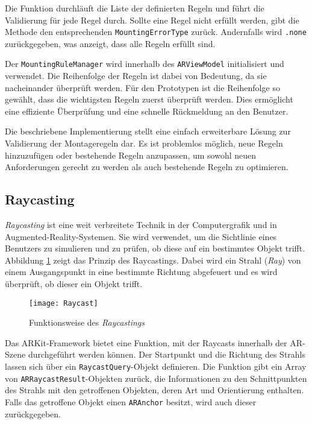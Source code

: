 Die Funktion durchläuft die Liste der definierten Regeln und führt die Validierung für jede Regel durch. Sollte eine Regel nicht erfüllt werden, gibt die Methode den entsprechenden \texttt{MountingErrorType} zurück. Andernfalls wird \texttt{.none} zurückgegeben, was anzeigt, dass alle Regeln erfüllt sind.

Der \texttt{MountingRuleManager} wird innerhalb des \texttt{ARViewModel} initialisiert und verwendet. Die Reihenfolge der Regeln ist dabei von Bedeutung, da sie nacheinander überprüft werden. Für den Prototypen ist die Reihenfolge so gewählt, dass die wichtigsten Regeln zuerst überprüft werden. Dies ermöglicht eine effiziente Überprüfung und eine schnelle Rückmeldung an den Benutzer.

Die beschriebene Implementierung stellt eine einfach erweiterbare Lösung zur Validierung der Montageregeln dar. Es ist problemlos möglich, neue Regeln hinzuzufügen oder bestehende Regeln anzupassen, um sowohl neuen Anforderungen gerecht zu werden als auch bestehende Regeln zu optimieren.

\subsection{Raycasting}\label{Raycasting}

\textit{Raycasting} ist eine weit verbreitete Technik in der Computergrafik und in Augmented-Reality-Systemen. Sie wird verwendet, um die Sichtlinie eines Benutzers zu simulieren und zu prüfen, ob diese auf ein bestimmtes Objekt trifft. Abbildung \ref{fig:Raycasting} zeigt das Prinzip des Raycastings. Dabei wird ein Strahl (\textit{Ray}) von einem Ausgangspunkt in eine bestimmte Richtung abgefeuert und es wird überprüft, ob dieser ein Objekt trifft.

\begin{figure}[ht]
    \centering
    \texttt{[image: Raycast]}
    \caption{Funktionsweise des \textit{Raycastings}}
    \label{fig:Raycasting}
\end{figure}

Das ARKit-Framework bietet eine Funktion, mit der Raycasts innerhalb der AR-Szene durchgeführt werden können. Der Startpunkt und die Richtung des Strahls lassen sich über ein \texttt{RaycastQuery}-Objekt definieren. Die Funktion gibt ein Array von \texttt{ARRaycastResult}-Objekten zurück, die Informationen zu den Schnittpunkten des Strahls mit den getroffenen Objekten, deren Art und Orientierung enthalten. Falls das getroffene Objekt einen \texttt{ARAnchor} besitzt, wird auch dieser zurückgegeben.

